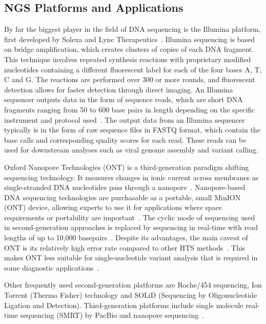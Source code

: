 \subsection{NGS Platforms and Applications}
By far the biggest player in the field of DNA sequencing is the Illumina platform, first developed by Solexa and Lync Therapeutics~\cite{illumina2015introduction}. Illumina sequencing is based on bridge amplification, which creates clusters of copies of each DNA fragment. This technique involves repeated synthesis reactions with proprietary modified nucleotides containing a different fluorescent label for each of the four bases A, T, C and G. The reactions are performed over 300 or more rounds, and fluorescent detection allows for faster detection through direct imaging. An Illumina sequencer outputs data in the form of sequence reads, which are short DNA fragments ranging from 50 to 600 base pairs in length depending on the specific instrument and protocol used~\cite{illumina2015introduction, slatko2018overview, mardis2008next}. The output data from an Illumina sequencer typically is in the form of raw sequence files in FASTQ format, which contain the base calls and corresponding quality scores for each read. These reads can be used for downstream analyses such as viral genome assembly and variant calling.

Oxford Nanopore Technologies (ONT) is a third-generation paradigm shifting sequencing technology. It measures changes in ionic current across membranes as single-stranded DNA nucleotides pass through a nanopore~\cite{jain2016oxford}. Nanopore-based DNA sequencing technologies are purchasable as a portable, small MinION (ONT) device, allowing experts to use it for applications where space requirements or portability are important~\cite{greninger2015rapid, jain2016oxford}. The cyclic mode of sequencing used in second-generation approaches is replaced by sequencing in real-time with read lengths of up to 10,000 basepairs~\cite{jain2016oxford}. Despite its advantages, the main caveat of ONT is its relatively high error rate compared to other HTS methods~\cite{fu2019comparative}. This makes ONT less suitable for single-nucleotide variant analysis that is required in some diagnostic applications~\cite{bowden2019sequencing, stefan2022comparison}.

Other frequently used second-generation platforms are Roche/454 sequencing, Ion Torrent (Thermo Fisher) technology and SOLiD (Sequencing by Oligonucleotide Ligation and Detection). Third-generation platforms include single molecule real-time sequencing (SMRT) by PacBio and nanopore sequencing~\cite{rhoads2015pacbio}. 

